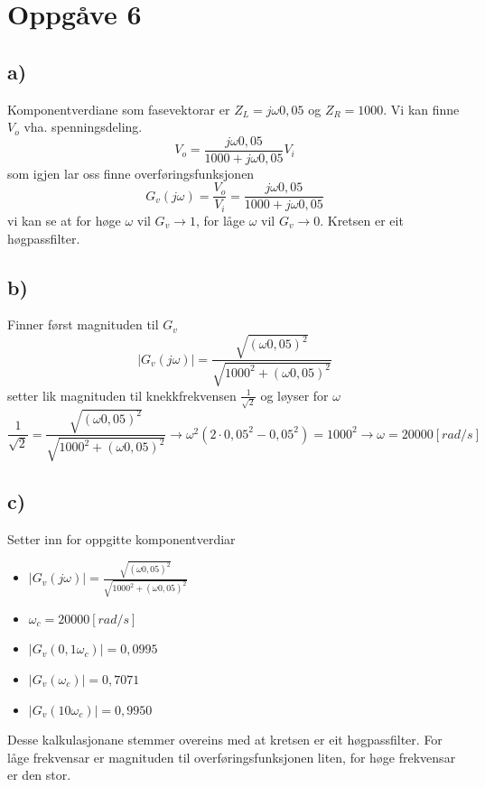 \documentclass[12pt,a4paper]{article}
\begin{document}
  \section*{Oppgåve 6}
    \subsection*{a)}
    Komponentverdiane som fasevektorar er $Z_L = j\omega 0,05$ og $Z_R = 1000$.
    Vi kan finne $V_o$ vha. spenningsdeling.
    \begin{equation}
      V_o = \frac{j\omega 0,05}{1000 + j\omega 0,05}V_i
    \end{equation}
    som igjen lar oss finne overføringsfunksjonen
    \begin{equation}
      G_v(j\omega) = \frac{V_o}{V_i} = \frac{j\omega 0,05}{1000 + j\omega 0,05}
    \end{equation}
    vi kan se at for høge $\omega$ vil $G_v \rightarrow 1$, for låge $\omega$ vil
    $G_v \rightarrow 0$. Kretsen er eit høgpassfilter.

    \subsection*{b)}
    Finner først magnituden til $G_v$
    \begin{equation}
      |G_v(j\omega)| = \frac{\sqrt{(\omega 0,05)^2}}{\sqrt{1000^2 + (\omega 0,05)^2}}
    \end{equation}
    setter lik magnituden til knekkfrekvensen $\frac{1}{\sqrt{2}}$ og løyser for $\omega$
    \begin{equation}
      \frac{1}{\sqrt{2}} = \frac{\sqrt{(\omega 0,05)^2}}{\sqrt{1000^2 + (\omega 0,05)^2}}
      \rightarrow \omega ^2 (2\cdot 0,05^2 - 0,05^2) = 1000^2 
      \rightarrow \omega = 20000[rad/s]
    \end{equation}

    \subsection*{c)}
    Setter inn for oppgitte komponentverdiar
    \begin{itemize}
      \item $|G_v(j\omega)| = \frac{\sqrt{(\omega 0,05)^2}}{\sqrt{1000^2 + (\omega 0,05)^2}}$
      \item $\omega_c = 20000[rad/s]$
      \item $|G_v(0,1\omega_c)| = 0,0995$
      \item $|G_v(\omega_c)| = 0,7071$
      \item $|G_v(10\omega_c)| = 0,9950$
    \end{itemize}
    Desse kalkulasjonane stemmer overeins med at kretsen er eit høgpassfilter. For låge
    frekvensar er magnituden til overføringsfunksjonen liten, for høge frekvensar er
    den stor.
\end{document}
